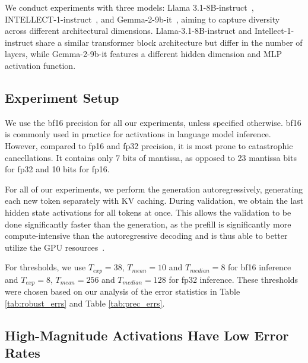\documentclass{article}
\theoremstyle{plain}
\theoremstyle{definition}
\theoremstyle{remark}
\begin{document}
We conduct experiments with three models: Llama 3.1-8B-instruct~\citep{llama3}, INTELLECT-1-instruct~\citep{intellect1}, and Gemma-2-9b-it~\citep{gemma2}, aiming to capture diversity across different architectural dimensions.
Llama-3.1-8B-instruct and Intellect-1-instruct share a similar transformer block architecture but differ in the number of layers, while Gemma-2-9b-it features a different hidden dimension and MLP activation function.

\subsection{Experiment Setup}
\label{experiment_setup}
We use the bf16 precision for all our experiments, unless specified otherwise. bf16 is commonly used in practice for activations in language model inference. However, compared to fp16 and fp32 precision, it is most prone to catastrophic cancellations. It contains only 7 bits of mantissa, as opposed to 23 mantissa bits for fp32 and 10 bits for fp16.

For all of our experiments, we perform the generation autoregressively, generating each new token separately with KV caching.
During validation, we obtain the last hidden state activations for all tokens at once.
This allows the validation to be done significantly faster than the generation, as the prefill is significantly more compute-intensive than the autoregressive decoding and is thus able to better utilize the GPU resources~\citep{chunked_prefill2, chunked_prefill}.

For thresholds, we use $T_{exp} = 38$, $T_{mean} = 10$ and $T_{median} = 8$ for bf16 inference and $T_{exp} = 8$, $T_{mean} = 256$ and $T_{median} = 128$ for fp32 inference.
These thresholds were chosen based on our analysis of the error statistics in Table \ref{tab:robust_errs} and Table \ref{tab:prec_errs}.

\subsection{High-Magnitude Activations Have Low Error Rates}
\label{high_magnitude_low_error}
\end{document}
